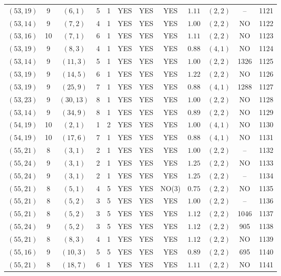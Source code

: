 \begin{longtable}{|c|c|c|c|c|c|c|c|c|c|c|c|}
$(53,19)$ & 9 & $(6,1)$ & 5 & 1 & YES & YES & YES & $1.11$ & $(2,2)$ & -- & 1121\\
$(53,14)$ & 9 & $(7,2)$ & 4 & 1 & YES & YES & YES & $1.00$ & $(2,2)$ & NO & 1122\\
$(53,16)$ & 10 & $(7,1)$ & 6 & 1 & YES & YES & YES & $1.11$ & $(2,2)$ & NO & 1123\\
$(53,19)$ & 9 & $(8,3)$ & 4 & 1 & YES & YES & YES & $0.88$ & $(4,1)$ & NO & 1124\\
$(53,14)$ & 9 & $(11,3)$ & 5 & 1 & YES & YES & YES & $1.00$ & $(2,2)$ & 1326 & 1125\\
$(53,19)$ & 9 & $(14,5)$ & 6 & 1 & YES & YES & YES & $1.22$ & $(2,2)$ & NO & 1126\\
$(53,19)$ & 9 & $(25,9)$ & 7 & 1 & YES & YES & YES & $0.88$ & $(4,1)$ & 1288 & 1127\\
$(53,23)$ & 9 & $(30,13)$ & 8 & 1 & YES & YES & YES & $1.00$ & $(2,2)$ & NO & 1128\\
$(53,14)$ & 9 & $(34,9)$ & 8 & 1 & YES & YES & YES & $0.89$ & $(2,2)$ & NO & 1129\\
$(54,19)$ & 10 & $(2,1)$ & 1 & 2 & YES & YES & YES & $1.00$ & $(4,1)$ & NO & 1130\\
$(54,19)$ & 10 & $(17,6)$ & 7 & 1 & YES & YES & YES & $0.88$ & $(4,1)$ & NO & 1131\\
$(55,21)$ & 8 & $(3,1)$ & 2 & 1 & YES & YES & YES & $1.00$ & $(2,2)$ & -- & 1132\\
$(55,24)$ & 9 & $(3,1)$ & 2 & 1 & YES & YES & YES & $1.25$ & $(2,2)$ & NO & 1133\\
$(55,24)$ & 9 & $(3,1)$ & 2 & 1 & YES & YES & YES & $1.25$ & $(2,2)$ & -- & 1134\\
$(55,21)$ & 8 & $(5,1)$ & 4 & 5 & YES & YES & NO(3) & $0.75$ & $(2,2)$ & NO & 1135\\
$(55,21)$ & 8 & $(5,2)$ & 3 & 5 & YES & YES & YES & $1.00$ & $(2,2)$ & -- & 1136\\
$(55,21)$ & 8 & $(5,2)$ & 3 & 5 & YES & YES & YES & $1.12$ & $(2,2)$ & 1046 & 1137\\
$(55,24)$ & 9 & $(5,2)$ & 3 & 5 & YES & YES & YES & $1.12$ & $(2,2)$ & 905 & 1138\\
$(55,21)$ & 8 & $(8,3)$ & 4 & 1 & YES & YES & YES & $1.12$ & $(2,2)$ & NO & 1139\\
$(55,16)$ & 9 & $(10,3)$ & 5 & 5 & YES & YES & YES & $0.89$ & $(2,2)$ & 695 & 1140\\
$(55,21)$ & 8 & $(18,7)$ & 6 & 1 & YES & YES & YES & $1.11$ & $(2,2)$ & NO & 1141\\

\end{longtable}
